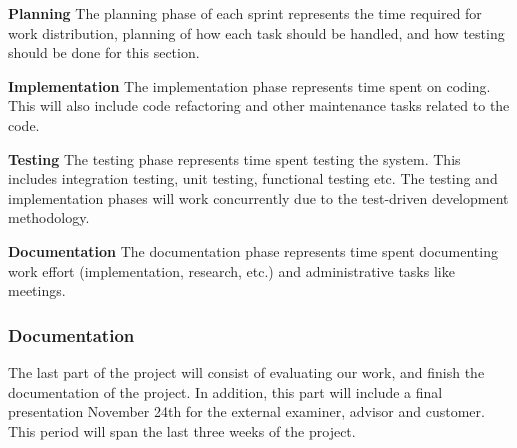 \textbf{Planning} The planning phase of each sprint represents the time
required for work distribution, planning of how each task should be handled,
and how testing should be done for this section.

\textbf{Implementation} The implementation phase represents time spent on coding.
This will also include code refactoring and other maintenance tasks
related to the code.

\textbf{Testing} The testing phase represents time spent testing the system.
This includes integration testing, unit testing, functional testing etc.
The testing and implementation phases will work concurrently due to the
test-driven development methodology.

\textbf{Documentation} The documentation phase represents time spent
documenting work effort (implementation, research, etc.) and administrative
tasks like meetings.

\subsubsection{Documentation}
The last part of the project will consist of evaluating our work, and finish the documentation of the project. In addition, this part will include a final presentation November 24th for the external examiner, advisor and customer. This period will span the last three weeks of the project.  
